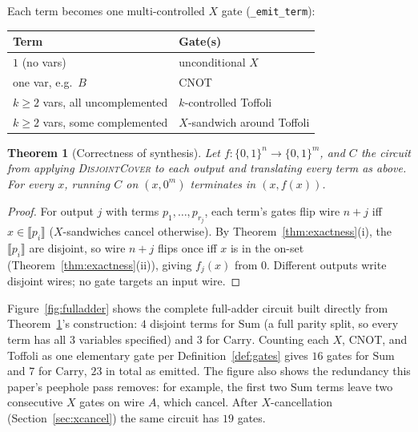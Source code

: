 \documentclass[conference]{IEEEtran}
\newcommand{\code}[1]{\texttt{#1}}
\newcommand{\Algo}[1]{\textup{\textsc{#1}}}
\theoremstyle{plain}
\newtheorem{theorem}{Theorem}
\begin{document}
Each term becomes one multi-controlled $X$ gate (\code{\_emit\_term}):

\begin{center}
\small
\begin{tabular}{@{}ll@{}}
\toprule
Term & Gate(s)\\
\midrule
$1$ (no vars) & unconditional $X$\\
one var, e.g.\ $B$ & CNOT\\
$k{\ge}2$ vars, all uncomplemented & $k$-controlled Toffoli\\
$k{\ge}2$ vars, some complemented & $X$-sandwich around Toffoli\\
\bottomrule
\end{tabular}
\end{center}

\begin{theorem}[Correctness of synthesis]
\label{thm:correctness}
Let $f:\{0,1\}^n\to\{0,1\}^m$, and $C$ the circuit from applying
\Algo{DisjointCover} to each output and translating every term as above.
For every $x$, running $C$ on $(x,0^m)$ terminates in $(x,f(x))$.
\end{theorem}
\begin{proof}
For output $j$ with terms $p_1,\dots,p_{r_j}$, each term's gates flip wire
$n{+}j$ iff $x\in\llbracket p_i\rrbracket$ ($X$-sandwiches cancel
otherwise). By Theorem~\ref{thm:exactness}(i), the $\llbracket p_i
\rrbracket$ are disjoint, so wire $n{+}j$ flips once iff $x$ is in the
on-set (Theorem~\ref{thm:exactness}(ii)), giving $f_j(x)$ from $0$.
Different outputs write disjoint wires; no gate targets an input wire.
\end{proof}

Figure~\ref{fig:fulladder} shows the complete full-adder circuit built
directly from Theorem~\ref{thm:correctness}'s construction: $4$ disjoint
terms for $\mathrm{Sum}$ (a full parity split, so every term has all $3$
variables specified) and $3$ for $\mathrm{Carry}$. Counting each $X$,
CNOT, and Toffoli as one elementary gate per Definition~\ref{def:gates}
gives $16$ gates for $\mathrm{Sum}$ and $7$ for $\mathrm{Carry}$, $23$ in
total as emitted. The figure also shows the redundancy this paper's
peephole pass removes: for example, the first two $\mathrm{Sum}$ terms
leave two consecutive $X$ gates on wire $A$, which cancel. After
$X$-cancellation (Section~\ref{sec:xcancel}) the same circuit has $19$
gates.
\end{document}
